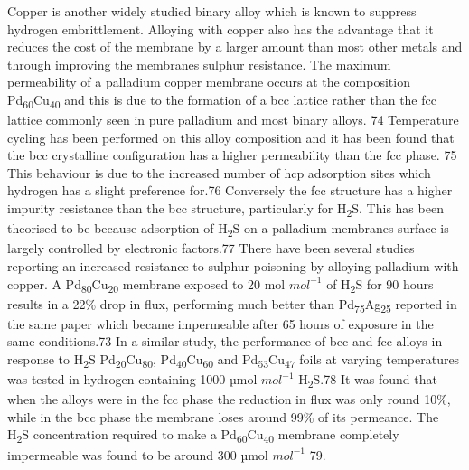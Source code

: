 Copper is another widely studied binary alloy which is known to suppress hydrogen 
embrittlement. Alloying with copper also has the advantage that it reduces the cost of the 
membrane by a larger amount than most other metals and through improving the membranes 
sulphur resistance. The maximum permeability of a palladium copper membrane occurs at the 
composition Pd\textsubscript{60}Cu\textsubscript{40} and this is due to the formation of a 
bcc lattice rather than the fcc lattice commonly seen in pure palladium and most binary 
alloys. 74 Temperature cycling has been performed on this alloy composition and it has been 
found that the bcc crystalline configuration has a higher permeability than the fcc phase. 75 
This behaviour is due to the increased number of hcp adsorption sites which hydrogen has a 
slight preference for.76 Conversely the fcc structure has a higher impurity resistance 
than the bcc structure, particularly for H\textsubscript{2}S. This has been theorised to be because 
adsorption of H\textsubscript{2}S on a palladium membranes surface is largely controlled by electronic 
factors.77 There have been several studies reporting an increased resistance to sulphur 
poisoning by alloying palladium with copper. A Pd\textsubscript{80}Cu\textsubscript{20} 
membrane exposed to 20 \textmu mol $mol^{-1}$ of H\textsubscript{2}S for 90 hours results in a 
22\% drop in flux, performing much better than Pd\textsubscript{75}Ag\textsubscript{25} reported in the same paper which 
became impermeable after 65 hours of exposure in the same conditions.73 In a similar study, 
the performance of bcc and fcc alloys in response to H\textsubscript{2}S 
Pd\textsubscript{20}Cu\textsubscript{80}, Pd\textsubscript{40}Cu\textsubscript{60} and 
Pd\textsubscript{53}Cu\textsubscript{47} foils at varying temperatures was tested in 
hydrogen containing 1000 µmol $mol^{-1}$  H\textsubscript{2}S.78 It was found that when the alloys were in the 
fcc phase the reduction in flux was only round 10\%, while in the bcc phase the membrane 
loses around 99\% of its permeance. The H\textsubscript{2}S concentration required to make a 
Pd\textsubscript{60}Cu\textsubscript{40} membrane completely impermeable was found to be around 300 µmol $mol^{-1}$ 79.

